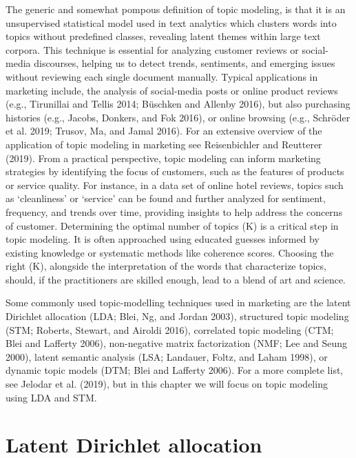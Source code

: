 The generic and somewhat pompous definition of topic modeling, is that it is an
unsupervised statistical model used in text analytics which clusters
words into topics without predefined classes, revealing latent themes
within large text corpora. This technique is essential for analyzing
customer reviews or social-media discourses, helping us to detect
trends, sentiments, and emerging issues without reviewing each
single document manually. Typical applications in marketing include, the analysis
of social-media posts or online product reviews (e.g., Tirunillai and
Tellis 2014; Büschken and Allenby 2016), but also purchasing histories
(e.g., Jacobs, Donkers, and Fok 2016), or online browsing
(e.g., Schröder et al. 2019; Trusov, Ma, and Jamal 2016). For an
extensive overview of the application of topic modeling in marketing see
Reisenbichler and Reutterer (2019). From a practical perspective, topic
modeling can inform marketing strategies by identifying the focus of
customers, such as the features of products or service quality. For
instance, in a data set of online hotel reviews, topics such as
`cleanliness' or `service' can be found and further analyzed for
sentiment, frequency, and trends over time, providing insights to help address
the concerns of customer. Determining the optimal number of
topics (K) is a critical step in topic modeling. It is often approached
using educated guesses informed by existing knowledge or systematic
methods like coherence scores. Choosing the right (K), alongside the
interpretation of the words that characterize topics, should, if the practitioners are skilled enough, lead to a blend
of art and science.

Some commonly used topic-modelling techniques used in marketing are the
latent Dirichlet allocation (LDA; Blei, Ng, and Jordan 2003),
structured topic modeling (STM; Roberts, Stewart, and Airoldi 2016),
correlated topic modeling (CTM; Blei and Lafferty 2006),
non-negative matrix factorization (NMF; Lee and Seung 2000), latent
semantic analysis (LSA; Landauer, Foltz, and Laham 1998), or dynamic
topic models (DTM; Blei and Lafferty 2006). For a more complete
list, see Jelodar et al. (2019), but in this chapter we will focus on
topic modeling using LDA and STM.

\section{Latent Dirichlet allocation}\label{latent-dirichlet-allocation}

